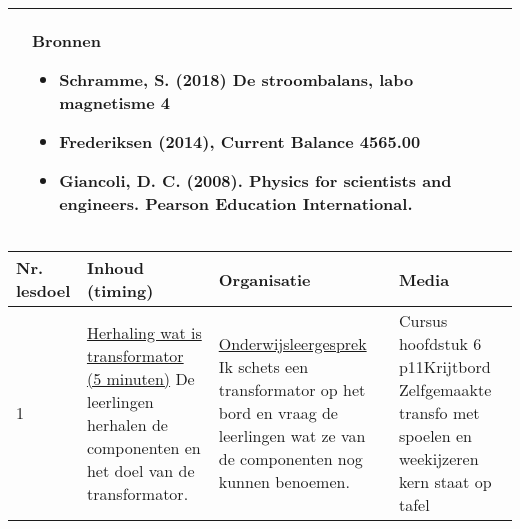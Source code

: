 \begin{landscape}
\begin{tabularx}{1.56\textwidth}{|p{}|X|}
		\\ \cline{2-2}
		  & \textbf{Bronnen}\begin{itemize}
		  	\item Schramme, S. (2018) De stroombalans, labo magnetisme 4
		  	\item Frederiksen (2014), Current Balance 4565.00
		  	\item Giancoli, D. C. (2008). Physics for scientists and engineers. Pearson Education International.
		  \end{itemize}\\ \hline
	\end{tabularx}


\newpage
	
	\begin{tabularx}{1.56\textwidth}{|p{1.5cm}|p{8cm}|X|p{4cm}|}
		\hline
		\textbf{Nr. lesdoel } & \textbf{Inhoud (timing)}  & \textbf{Organisatie } & \textbf{Media } \\ \hline
		1&\underline{Herhaling wat is transformator (5 minuten)}\newline
			De leerlingen herhalen de componenten en het doel van de transformator.
		&  \underline{Onderwijsleergesprek}\newline 
			Ik schets een transformator op het bord en vraag de leerlingen wat ze van de componenten nog kunnen benoemen.
		&   Cursus hoofdstuk 6 p11\newline\newline Krijtbord \newline\newline Zelfgemaakte transfo met spoelen en weekijzeren kern staat op tafel
		\\ \hline
	\end{tabularx}\vspace{5mm}



\end{landscape}
